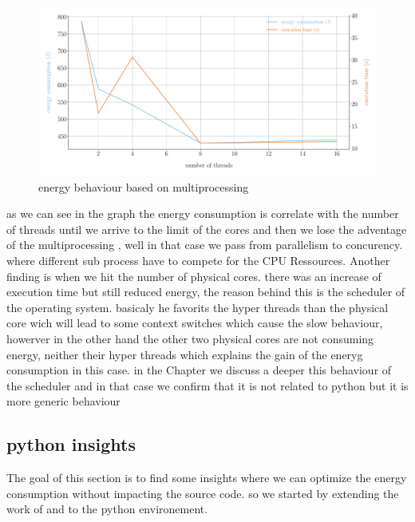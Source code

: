 \begin{figure}[hbt]
    \centering
    \includegraphics[width=\linewidth]{imgs/multiprocessing_energyvstime}
    \caption{energy behaviour based on multiprocessing}
    \label{fig:python_multiprocessing}
\end{figure}

as we can see in the graph the energy consumption is correlate with the number of threads until we arrive to the limit of the cores and then we lose the adventage of the multiprocessing , well in that case we pass from parallelism to concurency. where different sub process have to compete for the CPU Ressources.
Another finding is when we hit the number of physical cores. there was an increase of execution time but still reduced energy, the reason behind this is the scheduler of the operating system. basicaly he favorits the hyper threads than the physical core wich will lead to some context switches which cause the slow behaviour, howerver in the other hand the other two physical cores are not consuming energy, neither their hyper threads which explains the gain of the eneryg consumption in this case.
in the Chapter %
we discuss a deeper this behaviour of the scheduler and in that case we confirm that it is not related to python but it is more generic behaviour %



\subsection{python insights}

The goal of this section is to find some insights where we can optimize the energy consumption without impacting the source code. so we started by extending the work of \citeauthor{hasan_energy_2016} and \citeauthor{oliveira_recommending_nodate} to the python environement.



